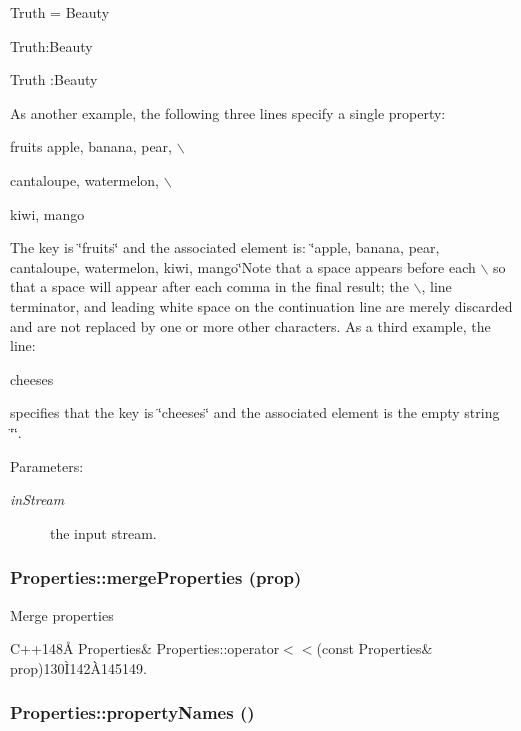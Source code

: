 Truth = Beauty \par
 Truth:Beauty \par
 Truth :Beauty \par
 As another example, the following three lines specify a single property:

fruits apple, banana, pear, $\backslash$ \par
 cantaloupe, watermelon, $\backslash$ \par
 kiwi, mango \par
 The key is \char`\"{}fruits\char`\"{} and the associated element is: \char`\"{}apple, banana, pear, cantaloupe, watermelon, kiwi, mango\char`\"{}Note that a space appears before each $\backslash$ so that a space will appear after each comma in the final result; the $\backslash$, line terminator, and leading white space on the continuation line are merely discarded and are not replaced by one or more other characters. As a third example, the line:

cheeses \par
 specifies that the key is \char`\"{}cheeses\char`\"{} and the associated element is the empty string \char`\"{}\char`\"{}.

\begin{Desc}
\item[Parameters:]
\begin{description}
\item[{\em in\-Stream}]the input stream.\end{description}
\end{Desc}
\subsubsection{\setlength{\rightskip}{0pt plus 5cm}Properties::merge\-Properties (prop)}\label{classProperties_Propertiesa24}


Merge properties

C++148\AA{} Properties\& Properties::operator$<$$<$(const Properties\& prop)130\`{I}142\`{A}145149. 

\subsubsection{\setlength{\rightskip}{0pt plus 5cm}Properties::property\-Names ()}\label{classProperties_Propertiesa17}


